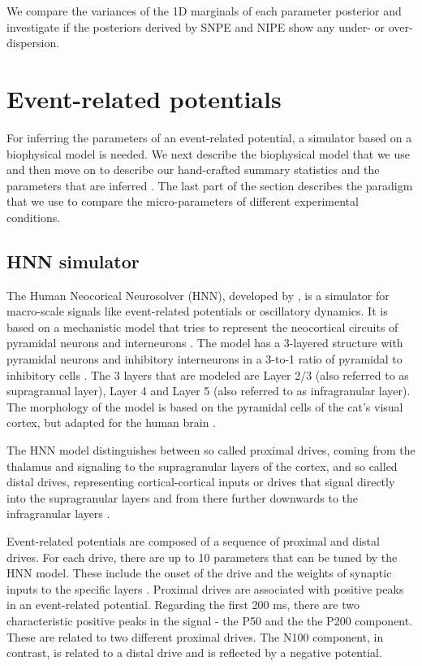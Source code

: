 \documentclass[12pt]{extreport}
\begin{document}
We compare the variances of the 1D marginals of each parameter posterior and investigate if the posteriors derived by SNPE and NIPE show any under- or over-dispersion. 


\section{Event-related potentials}

For inferring the parameters of an event-related potential, a simulator based on a biophysical model is needed. We next describe the biophysical model that we use and then move on to describe our hand-crafted summary statistics and the parameters that are inferred .
The last part of the section describes the paradigm that we use to compare the micro-parameters of different experimental conditions.

\subsection{HNN simulator}
\label{hnn}

The Human Neocorical Neurosolver (HNN), developed by \cite{neymotin2020human}, is a simulator for macro-scale signals like event-related potentials or oscillatory dynamics.  
It is based on a mechanistic model that tries to represent the neocortical circuits of pyramidal neurons and interneurons \citep{neymotin2020human}. The model has a 3-layered structure with pyramidal neurons and inhibitory interneurons in a 3-to-1 ratio of pyramidal to inhibitory cells \citep{neymotin2020human}. The 3 layers that are modeled are Layer 2/3 (also referred to as supragranual layer), Layer 4 and Layer 5 (also referred to as infragranular layer). The morphology of the model is based on the pyramidal cells of the cat's visual cortex, but adapted for the human brain \citep{kohl_neural_2021}.

The HNN model distinguishes between so called proximal drives, coming from the thalamus and signaling to the supragranular layers of the cortex, and so called distal drives, representing cortical-cortical inputs or drives that signal directly into the supragranular layers and from there further downwards to the infragranular layers \citep{neymotin2020human}. 

Event-related potentials are composed of a sequence of proximal and distal drives.
For each drive, there are up to 10 parameters that can be tuned by the HNN model. These include the onset of the drive and the weights of synaptic inputs to the specific layers \citep{neymotin2020human}.
Proximal drives are associated with positive peaks in an event-related potential. Regarding the first 200 ms, there are two characteristic positive peaks in the signal - the P50 and the the P200 component. These are related to two different proximal drives. The N100 component, in contrast, is related to a distal drive and is reflected by a negative potential. 
\end{document}
